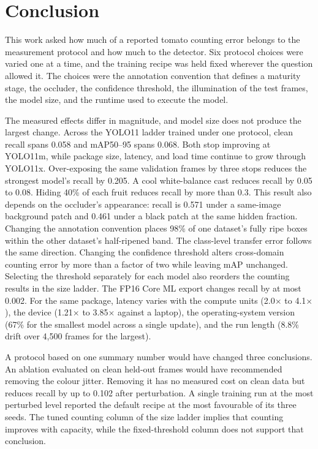 \section{Conclusion}
\label{sec:conclusion}

This work asked how much of a reported tomato counting error belongs to the
measurement protocol and how much to the detector. Six protocol choices were
varied one at a time, and the training recipe was held fixed wherever the
question allowed it. The choices were the annotation convention that defines a
maturity stage, the occluder, the confidence threshold, the illumination of the
test frames, the model size, and the runtime used to execute the model.

The measured effects differ in magnitude, and model size does not produce the
largest change. Across the YOLO11 ladder trained under one protocol, clean
recall spans 0.058 and mAP50--95 spans 0.068. Both stop improving at YOLO11m,
while package size, latency, and load time continue to grow through YOLO11x.
Over-exposing the same validation frames by three stops reduces the strongest
model's recall by 0.205. A cool white-balance cast reduces recall by 0.05 to
0.08. Hiding 40\% of each fruit reduces recall by more than 0.3. This result
also depends on the occluder's appearance: recall is 0.571 under a same-image
background patch and 0.461 under a black patch at the same hidden fraction.
Changing the annotation convention places 98\% of one dataset's fully ripe
boxes within the other dataset's half-ripened band. The class-level transfer
error follows the same direction. Changing the confidence threshold alters
cross-domain counting error by more than a factor of two while leaving mAP
unchanged. Selecting the threshold separately for each model also reorders the
counting results in the size ladder. The FP16 Core ML export changes recall by
at most 0.002. For the same package, latency varies with the compute units
(2.0$\times$ to 4.1$\times$), the device (1.21$\times$ to 3.85$\times$ against
a laptop), the operating-system version (67\% for the smallest model across a
single update), and the run length (8.8\% drift over 4{,}500 frames for the
largest).

A protocol based on one summary number would have changed three conclusions.
An ablation evaluated on clean held-out frames would have recommended removing
the colour jitter. Removing it has no measured cost on clean data but reduces
recall by up to 0.102 after perturbation. A single training run at the most
perturbed level reported the default recipe at the most favourable of its three
seeds. The tuned counting column of the size ladder implies that counting
improves with capacity, while the fixed-threshold column does not support that
conclusion.

